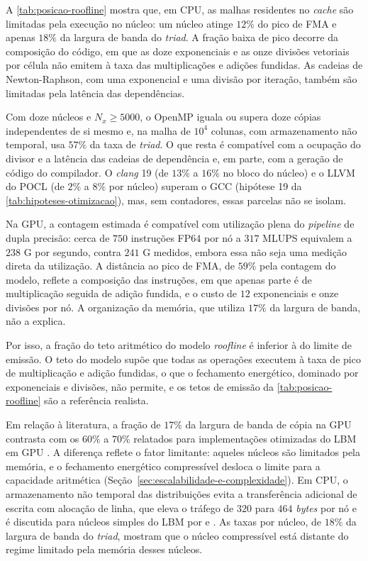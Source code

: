 A \autoref{tab:posicao-roofline} mostra que, em CPU, as malhas residentes no \textit{cache} são limitadas pela execução no núcleo: um núcleo atinge \(12\%\) do pico de FMA e apenas \(18\%\) da largura de banda do \textit{triad}.
A fração baixa de pico decorre da composição do código, em que as doze exponenciais e as onze divisões vetoriais por célula não emitem à taxa das multiplicações e adições fundidas.
As cadeias de Newton-Raphson, com uma exponencial e uma divisão por iteração, também são limitadas pela latência das dependências.

Com doze núcleos e \(N_x \geq 5000\), o OpenMP iguala ou supera doze cópias independentes de si mesmo e, na malha de \(10^4\) colunas, com armazenamento não temporal, usa \(57\%\) da taxa de \textit{triad}.
O que resta é compatível com a ocupação do divisor e a latência das cadeias de dependência e, em parte, com a geração de código do compilador.
O \textit{clang} 19 (de \(13\%\) a \(16\%\) no bloco do núcleo) e o LLVM do POCL (de \(2\%\) a \(8\%\) por núcleo) superam o GCC (hipótese 19 da \autoref{tab:hipoteses-otimizacao}), mas, sem contadores, essas parcelas não se isolam.

Na GPU, a contagem estimada é compatível com utilização plena do \textit{pipeline} de dupla precisão: cerca de \(750\) instruções FP64 por nó a \(317\) MLUPS equivalem a \(238\) G por segundo, contra \(241\) G medidos, embora essa não seja uma medição direta da utilização.
A distância ao pico de FMA, de \(59\%\) pela contagem do modelo, reflete a composição das instruções, em que apenas parte é de multiplicação seguida de adição fundida, e o custo de \(12\) exponenciais e onze divisões por nó.
A organização da memória, que utiliza \(17\%\) da largura de banda, não a explica.

Por isso, a fração do teto aritmético do modelo \textit{roofline} é inferior à do limite de emissão.
O teto do modelo supõe que todas as operações executem à taxa de pico de multiplicação e adição fundidas, o que o fechamento energético, dominado por exponenciais e divisões, não permite, e os tetos de emissão da \autoref{tab:posicao-roofline} são a referência realista.

Em relação à literatura, a fração de \(17\%\) da largura de banda de cópia na GPU contrasta com os \(60\%\) a \(70\%\) relatados para implementações otimizadas do LBM em GPU \parencite{Tomczak2021}.
A diferença reflete o fator limitante: aqueles núcleos são limitados pela memória, e o fechamento energético compressível desloca o limite para a capacidade aritmética (Seção~\ref{sec:escalabilidade-e-complexidade}).
Em CPU, o armazenamento não temporal das distribuições evita a transferência adicional de escrita com alocação de linha, que eleva o tráfego de \(320\) para \(464\) \textit{bytes} por nó e é discutida para núcleos simples do LBM por \textcite{Wellein2006} e \textcite{Wittmann2013}.
As taxas por núcleo, de \(18\%\) da largura de banda do \textit{triad}, mostram que o núcleo compressível está distante do regime limitado pela memória desses núcleos.

